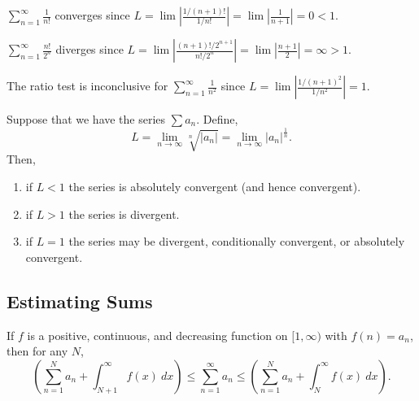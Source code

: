 \begin{exampleblock}
$\displaystyle \sum_{n=1}^\infty \frac{1}{n!}$ converges since $\displaystyle L=\lim\left|\frac{1/(n+1)!}{1/n!}\right|=\lim\left|\frac{1}{n+1}\right|=0<1$.
\end{exampleblock}

\begin{exampleblock}
$\displaystyle \sum_{n=1}^\infty \frac{n!}{2^n}$ diverges since $\displaystyle L=\lim\left|\frac{(n+1)!/2^{n+1}}{n!/2^{n}}\right|=\lim\left|\frac{n+1}{2}\right|=\infty>1$.
\end{exampleblock}

\begin{exampleblock}
The ratio test is inconclusive for $\displaystyle \sum_{n=1}^\infty \frac{1}{n^2}$ since $\displaystyle L=\lim\left|\frac{1/(n+1)^2}{1/n^2}\right|=1$.
\end{exampleblock}



\begin{thm}
Suppose that we have the series $\sum a_{n}$. Define,
$$L=\lim _{n \to \infty} \sqrt[n]{\left|a_{n}\right|}=\lim _{n \rightarrow \infty}\left|a_{n}\right|^{\frac{1}{n}}.$$
Then,
\begin{enumerate}[leftmargin=1em]
    \item if $L<1$ the series is absolutely convergent (and hence convergent).
    \item if $L>1$ the series is divergent.
    \item if $L=1$ the series may be divergent, conditionally convergent, or absolutely convergent.
\end{enumerate}
\end{thm}



\subsection{Estimating Sums}



\begin{thm}
If $f$ is a positive, continuous, and decreasing function on $[1,\infty)$ with $f(n)=a_n$, then for any $N$,
$$\left(\sum_{n=1}^N a_n+\int_{N+1}^\infty f(x)\ dx \right)
\leq \sum_{n=1}^\infty a_n \leq 
\left(\sum_{n=1}^N a_n+  \int_{N}^\infty f(x)\ dx\right).$$
\end{thm}

